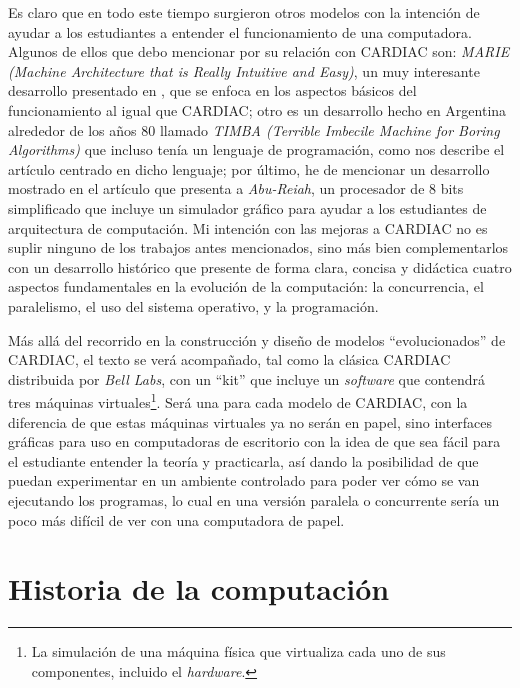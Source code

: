 \documentclass[letterpaper,12pt,oneside]{book}
\begin{document}
	Es claro que en todo este tiempo surgieron otros modelos con la intención de ayudar a los estudiantes a entender el funcionamiento de una computadora. Algunos
	de ellos que debo mencionar por su relación con CARDIAC son: \textit{MARIE (Machine Architecture that is Really Intuitive and Easy)}, un muy interesante 
	desarrollo presentado en \cite{null_essentials_2003}, que se enfoca en los aspectos básicos del funcionamiento al igual que CARDIAC; otro es un desarrollo
	hecho en Argentina alrededor de los años 80 llamado \textit{TIMBA (Terrible Imbecile Machine for Boring Algorithms)} que incluso tenía un lenguaje de programación,
	como nos describe el artículo \cite{alvaro_frias_retruco_2022} centrado en dicho lenguaje; por último, he de mencionar un desarrollo
	mostrado en el artículo \cite{ajdari_design_2012} que presenta a \textit{Abu-Reiah}, un procesador de 8 bits simplificado que incluye un simulador 
	gráfico
	para ayudar a los estudiantes de arquitectura de computación. Mi intención con las mejoras a CARDIAC no es suplir ninguno de los trabajos antes mencionados,
	sino más bien complementarlos con un desarrollo histórico que presente de forma clara, concisa y didáctica cuatro aspectos fundamentales en la evolución
	de la computación: la concurrencia, el paralelismo, el uso del sistema operativo, y la programación.
	
	
	Más allá del recorrido en la construcción y diseño de modelos ``evolucionados'' de CARDIAC, el texto se verá acompañado,
	tal como la clásica CARDIAC distribuida por \textit{Bell Labs}, con un ``kit'' que incluye un \textit{software} que contendrá tres máquinas virtuales\footnote{La simulación de una
	máquina física que virtualiza cada uno de sus componentes, incluido el \textit{hardware}.}. Será una para cada
	modelo de CARDIAC, con la diferencia de que estas máquinas virtuales ya no serán en papel, sino interfaces gráficas para uso en computadoras de escritorio con la idea de 
	que sea fácil para el estudiante
	entender la teoría y practicarla, así dando la posibilidad de que puedan experimentar en un ambiente controlado para poder ver cómo se van ejecutando los programas, lo cual en una versión paralela o concurrente sería un poco más difícil de ver con una 
	computadora de papel.
	


\tableofcontents
\listoffigures

\mainmatter

\chapter{Historia de la computación} 
\end{document}
